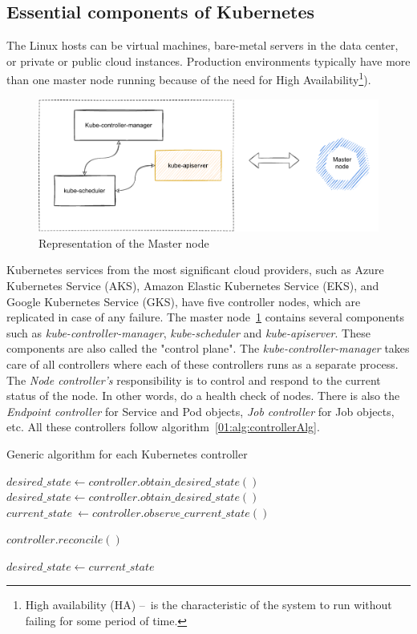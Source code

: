 \subsection{Essential components of Kubernetes}
The Linux hosts can be virtual machines, bare-metal servers in the data center, or private or public cloud instances. Production environments typically have more than one master node running because of the need for High Availability\footnote{High availability (HA) \---\ is the characteristic of the system to run without failing for some period of time.}).
\begin{figure}[!h]
    \centering
    \includegraphics[scale=0.82]{obrazky-figures/02-preliminaries/01-kubernetes/02-architecture-master-sketch}
    \caption{Representation of the Master node}
    \label{02:fig:masterNode}
\end{figure}
Kubernetes services from the most significant cloud providers, such as Azure Kubernetes Service (AKS), Amazon Elastic Kubernetes Service (EKS), and Google Kubernetes Service (GKS), have five controller nodes, which are replicated in case of any failure.
The master node~\ref{02:fig:masterNode} contains several components such as \emph{kube-controller-manager}, \emph{kube-scheduler} and \emph{kube-apiserver}.
These components are also called the "control plane".
The \emph{kube-controller-manager} takes care of all controllers where each of these controllers runs as a separate process.
The \emph{Node controller's} responsibility is to control and respond to the current status of the node.
In other words, do a health check of nodes.
There is also the \emph{Endpoint controller} for Service and Pod objects, \emph{Job controller} for Job objects, etc.
All these controllers follow algorithm~\ref{01:alg:controllerAlg}.
\begin{algorithm}[H]
    \caption{Generic algorithm for each Kubernetes controller}
    \label{01:alg:controllerAlg}

    \begin{algorithmic}[1]
        \State $desired\_state \gets controller.obtain\_desired\_state()$
            \State $desired\_state \gets controller.obtain\_desired\_state()$
            \State $current\_state\ \gets controller.observe\_current\_state()$

                \State $controller.reconcile()$
            \EndIf

            \State $desired\_state \gets current\_state$
        \EndWhile
    \end{algorithmic}
\end{algorithm}
